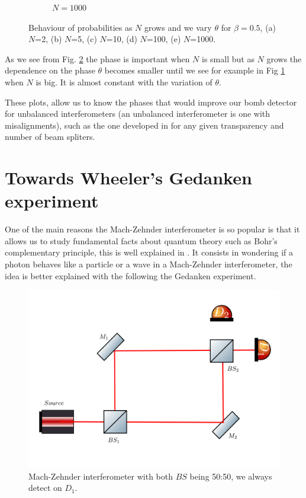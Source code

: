 \documentclass[12pt]{book}
\begin{document}
\begin{figure}[!t]
\begin{subfigure}[b]{0.30\linewidth}
\caption{$N=1000$ }
\label{1000}
\end{subfigure}
\caption{Behaviour of probabilities as $N$ grows and we vary $\theta$ for $\beta=0.5$, (a) $N$=2, (b) $N$=5, (c) $N$=10, (d) $N$=100, (e) $N$=1000.}
\label{con_fase}
\end{figure}

As we see from Fig. \ref{con_fase} the phase is important when $N$ is small but as $N$  grows the dependence on the phase $\theta$ becomes smaller until we see for example in Fig \ref{1000} when $N$ is big. It is almost constant with the variation of $\theta$.

These plots, allow us to know the phases that would improve our bomb detector for unbalanced interferometers (an unbalanced interferometer is one with misalignments), such as the one developed in \cite{Chao_2018} for any given transparency and number of beam spliters.


\section{Towards Wheeler's Gedanken experiment}

One of the main reasons the Mach-Zehnder interferometer is so popular is that it allows us to study fundamental facts about quantum theory such as Bohr's complementary principle, this is well explained in \cite{delayed}. It consists in wondering if a photon behaves like a particle or a wave in a Mach-Zehnder interferometer, the idea is better explained with the following the Gedanken experiment.

\begin{figure}[H]
\centering
\includegraphics[width=\linewidth,height=6.5 cm]{images/wheeler1.png}
\caption{Mach-Zehnder interferometer with both $BS$ being 50:50, we always detect on $D_{1}$.}
\label{wheeler1}
\end{figure}
\end{document}
